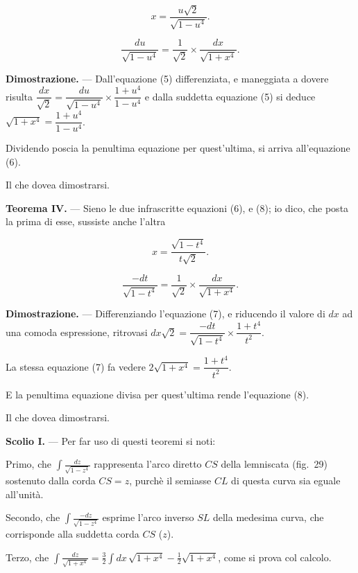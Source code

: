 \documentclass{article}
\begin{document}
\[ x = \frac{u\sqrt{2}}{\sqrt{1-u^{4}}}. \tag{5} \]

\[ \frac{du}{\sqrt{1-u^{4}}} = \frac{1}{\sqrt{2}}\times\frac{dx}{\sqrt{1+x^{4}}}. \tag{6} \]

\textbf{Dimostrazione.} --- Dall'equazione (5) differenziata, e maneggiata a dovere risulta
$\dfrac{dx}{\sqrt{2}} = \dfrac{du}{\sqrt{1-u^{4}}} \times \dfrac{1+u^{4}}{1-u^{4}}$ e dalla
suddetta equazione (5) si deduce $\sqrt{1+x^{4}} = \dfrac{1+u^{4}}{1-u^{4}}$.

Dividendo poscia la penultima equazione per quest'ultima, si arriva all'equazione (6).

Il che dovea dimostrarsi.

\textbf{Teorema IV.} --- Sieno le due infrascritte equazioni (6), e (8); io dico, che posta la
prima di esse, sussiste anche l'altra

\[ x = \frac{\sqrt{1-t^{4}}}{t\sqrt{2}}. \tag{7} \]

\[ \frac{-dt}{\sqrt{1-t^{4}}} = \frac{1}{\sqrt{2}}\times\frac{dx}{\sqrt{1+x^{4}}}. \tag{8} \]

\textbf{Dimostrazione.} --- Differenziando l'equazione (7), e riducendo il valore di $dx$ ad una
comoda espressione, ritrovasi $dx\sqrt{2} = \dfrac{-dt}{\sqrt{1-t^{4}}} \times \dfrac{1+t^{4}}{t^{2}}$.

La stessa equazione (7) fa vedere $2\sqrt{1+x^{4}} = \dfrac{1+t^{4}}{t^{2}}$.

E la penultima equazione divisa per quest'ultima rende l'equazione (8).

Il che dovea dimostrarsi.

\textbf{Scolio I.} --- Per far uso di questi teoremi si noti:

Primo, che $\displaystyle\int \frac{dz}{\sqrt{1-z^{4}}}$ rappresenta l'arco diretto $CS$ della
lemniscata (fig.~29) sostenuto dalla corda $CS = z$, purchè il semiasse $CL$ di questa curva sia
eguale all'unità.


Secondo, che $\displaystyle\int \frac{-dz}{\sqrt{1-z^{4}}}$ esprime l'arco inverso $SL$ della
medesima curva, che corrisponde alla suddetta corda $CS$ ($z$).

Terzo, che $\displaystyle\int \frac{dz}{\sqrt{1+x^{4}}} = \frac{3}{2}\int dx\,\sqrt{1+x^{4}} -
\frac{1}{2}\sqrt{1+x^{4}}$, come si prova col calcolo.
\end{document}
